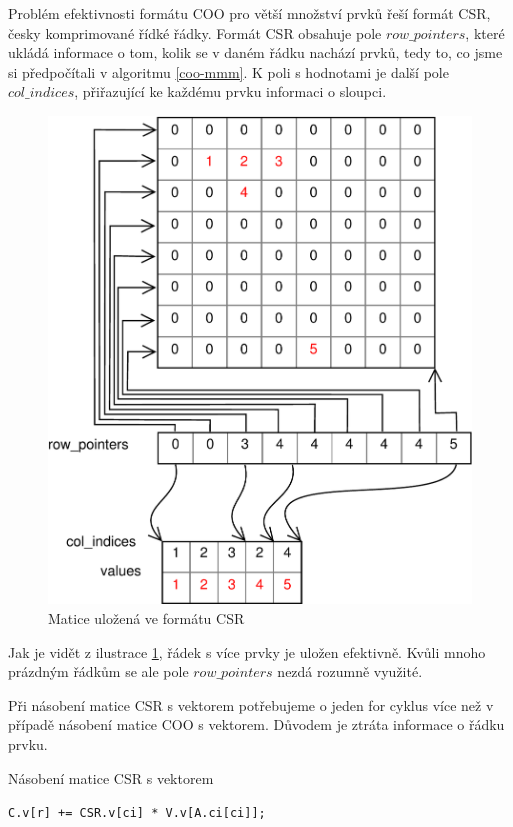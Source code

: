 Problém efektivnosti formátu COO pro větší množství prvků řeší formát CSR, česky komprimované řídké řádky. Formát CSR obsahuje pole $row\_pointers$, které ukládá informace o tom, kolik se v daném řádku nachází prvků, tedy to, co jsme si předpočítali v algoritmu \ref{coo-mmm}. K poli s hodnotami je další pole $col\_indices$, přiřazující ke každému prvku informaci o sloupci.

\begin{figure}[htb]\centering
	\includegraphics[width=\textwidth]{./images/csr/csr}
	\caption{Matice uložená ve formátu CSR}
	\label{fig:CSR}
\end{figure}

Jak je vidět z ilustrace \ref{fig:CSR}, řádek s více prvky je uložen efektivně. Kvůli mnoho prázdným řádkům se ale pole $row\_pointers$ nezdá rozumně využité.

Při násobení matice CSR s vektorem potřebujeme o jeden for cyklus více než v případě násobení matice COO s vektorem. Důvodem je ztráta informace o řádku prvku.

\begin{algorithm}[htb]
	\caption{Násobení matice CSR s vektorem}\label{csr-mvm}
	\begin{algorithmic}[1]
				\State \texttt{C.v[r] += CSR.v[ci] * V.v[A.ci[ci]];}
			\EndFor
		\EndFor
		\EndProcedure
	\end{algorithmic}
\end{algorithm}

